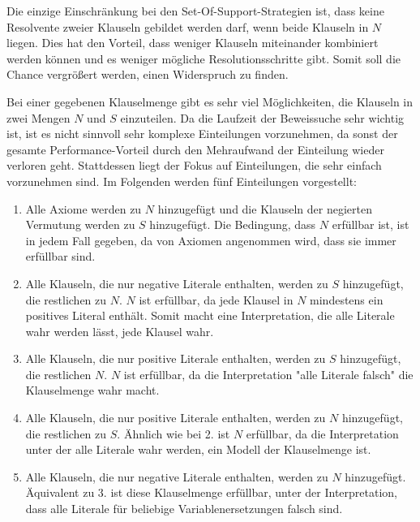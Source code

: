 Die einzige Einschränkung bei den Set-Of-Support-Strategien ist, dass keine Resolvente zweier Klauseln gebildet werden darf, wenn beide Klauseln in $N$ liegen. Dies hat den Vorteil, dass weniger Klauseln miteinander kombiniert werden können und es weniger mögliche Resolutionsschritte gibt. Somit soll die Chance vergrößert werden, einen Widerspruch zu finden.


Bei einer gegebenen Klauselmenge gibt es sehr viel Möglichkeiten, die Klauseln in zwei Mengen $N$ und $S$ einzuteilen. Da die Laufzeit der Beweissuche sehr wichtig ist, ist es nicht sinnvoll sehr komplexe Einteilungen vorzunehmen, da sonst der gesamte Performance-Vorteil durch den Mehraufwand der Einteilung wieder verloren geht. Stattdessen liegt der Fokus auf Einteilungen, die sehr einfach vorzunehmen sind. Im Folgenden werden fünf Einteilungen vorgestellt:
\begin{enumerate}
	\item Alle Axiome werden zu $N$ hinzugefügt und die Klauseln der negierten Vermutung werden zu $S$ hinzugefügt. Die Bedingung, dass $N$ erfüllbar ist, ist in jedem Fall gegeben, da von Axiomen angenommen wird, dass sie immer erfüllbar sind.
	\item Alle Klauseln, die nur negative Literale enthalten, werden zu $S$ hinzugefügt, die restlichen zu $N$. $N$ ist erfüllbar, da jede Klausel in $N$ mindestens ein positives Literal enthält. Somit macht eine Interpretation, die alle Literale wahr werden lässt, jede Klausel wahr.
	\item Alle Klauseln, die nur positive Literale enthalten, werden zu $S$ hinzugefügt, die restlichen $N$. $N$ ist erfüllbar, da die Interpretation "alle Literale falsch" die Klauselmenge wahr macht.
	\item Alle Klauseln, die nur positive Literale enthalten, werden zu $N$ hinzugefügt, die restlichen zu $S$. Ähnlich wie bei 2. ist $N$ erfüllbar, da die Interpretation unter der alle Literale wahr werden, ein Modell der Klauselmenge ist.
	\item Alle Klauseln, die nur negative Literale enthalten, werden zu $N$ hinzugefügt. Äquivalent zu 3. ist diese Klauselmenge erfüllbar, unter der Interpretation, dass alle Literale für beliebige Variablenersetzungen falsch sind.
\end{enumerate}

	

